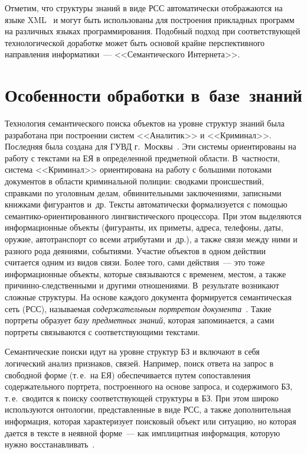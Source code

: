 \begin{multicols}{2}
    Отметим, что структуры знаний в виде РСС автоматически отображаются 
на языке XML~\cite{9sha} и могут быть использованы для построения 
прикладных программ на различных языках программирования. Подобный 
подход при соответствующей технологической доработке может быть основой 
крайне перспективного направления информатики~--- <<Семантического 
Интернета>>.

\vspace*{-9pt}
    
\section{Особенности обработки в~базе~знаний}

\vspace*{-3pt}
    
    Технология семантического поиска объектов на уровне структур знаний 
была разработана при построении систем <<Аналитик>> и <<Криминал>>. 
Последняя была создана для ГУВД г.~Москвы~\cite{4sha, 3sha, 8sha}. Эти системы 
ориентированы на работу с текстами на ЕЯ в определенной предметной 
области. В~частности, система <<Криминал>> ориентирована на работу с 
большими потоками документов в области криминальной полиции: сводками 
происшествий, справками по уголовным делам, обвинительными 
заключениями, записными книжками фигурантов и~др. Тексты автоматически 
формализуется с помощью семантико-ориентированного лингвистического 
процессора. При этом выделяются информационные объекты (фигуранты, их 
приметы, адреса, телефоны, даты, оружие, автотранспорт со всеми атрибутами 
и~др.), а также связи между ними и разного рода деяниями, событиями. 
Участие объектов в одном действии считается одним из видов связи. Более 
того, сами действия~--- это тоже информационные объекты, которые 
связываются с временем, местом, а также причинно-следственными и другими 
отношениями. В~результате возникают сложные структуры. На основе каждого 
документа формируется семантическая сеть (РСС), называ\-емая 
\textit{содержательным портретом документа}~\cite{6sha, 7sha}. Такие 
портреты образует \textit{базу предметных знаний}, которая 
запоминается, а сами портреты связываются с соответствующими текстами.
    
    Семантические поиски идут на уровне структур БЗ и включают в себя 
логический анализ признаков, связей. Например, поиск ответа на запрос в 
свободной форме (т.\,е.\ на ЕЯ) обеспечивается путем сопоставления 
содержательного портрета, построенного на основе запроса, и содержимого БЗ, 
т.\,е.\ сводится к поиску соответствующей структуры в БЗ. При этом широко 
используются онтологии, представленные в виде РСС, а также дополнительная 
информация, которая характеризует поисковый объект или ситуацию, но 
которая дается в тексте в неявной форме~--- как имплицитная информация, 
которую нужно восстанавливать~\cite{10sha}.
    

\end{multicols}

